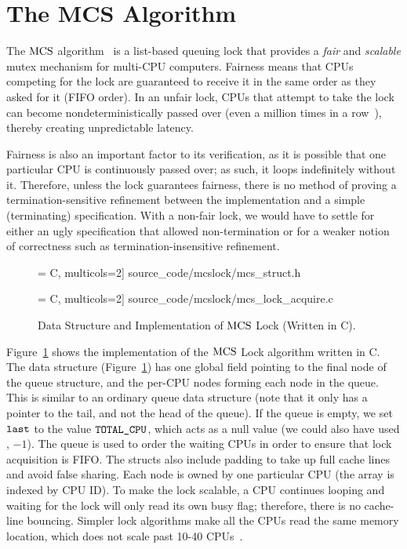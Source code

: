 \section{The MCS Algorithm}
\label{chapter:mcslock:sec:overview}

The $\mathrm{MCS}$ algorithm~\cite{mcs91} is a list-based queuing lock that provides a \textit{fair} and \textit{scalable} mutex mechanism for multi-CPU computers. Fairness means that CPUs competing for the lock are guaranteed to receive it in the same order as they asked for it (FIFO order).
In  an unfair lock, CPUs
that attempt to take the lock can become nondeterministically passed over (even a million times in a row~\cite{lwn:ticketlocks}), thereby creating unpredictable latency.

Fairness is also an important factor to its verification, as it is possible that one particular CPU is continuously passed over; 
as such, it loops indefinitely without it. 
Therefore, unless the lock guarantees fairness, there is no method of proving a termination-sensitive refinement between the implementation and a simple (terminating) specification. 
With a non-fair lock, we would have to settle for either an ugly specification that allowed non-termination or for a weaker notion of correctness such as termination-insensitive refinement.
\begin{figure}
 = C, multicols=2] {source_code/mcslock/mcs_struct.h}
\vspace{1em}

 = C, multicols=2] {source_code/mcslock/mcs_lock_acquire.c}
\caption{Data Structure and Implementation of $\mathrm{MCS}$ Lock (Written in C).}
\label{fig:chapter:mcslock:mcs_lock}
\end{figure}

Figure~\ref{fig:chapter:mcslock:mcs_lock} shows the implementation of the $\mathrm{MCS}$ Lock algorithm written in C. 
The data structure  (Figure~\ref{fig:chapter:mcslock:mcs_lock})
has one global field pointing to the final node of the queue structure, and the 
per-CPU nodes forming each node in the queue. This is similar to an ordinary queue data structure (note that it only has a pointer to the tail, and not the head of the queue).
If the queue is empty, we set ${\mathrm{\texttt{last}}}$ to the value ${\mathrm{\texttt{TOTAL\_CPU}}}$, which acts as a null value (we could also have used \eg, $-1$). 
The queue is used to order the waiting CPUs in order to ensure that lock acquisition is FIFO. 
The structs also include padding to take up full cache lines and avoid false sharing. 
Each node is owned by one particular CPU (the array is indexed by CPU ID). 
To make the lock scalable, a CPU continues looping and waiting for the lock will only read its own busy flag; 
therefore, there is no cache-line bouncing. 
Simpler lock algorithms make all the CPUs read the same memory location, which does not scale past 10-40 CPUs~\cite{Boyd-wickizer12}.

